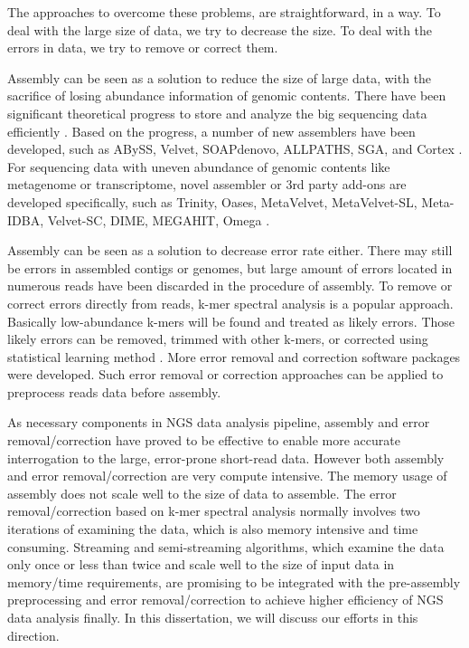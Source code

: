 The approaches to overcome these problems, are straightforward, in a way. To deal
with the large size of data, we try to decrease the size. To deal with the 
errors in data, we try to remove or correct them. 

Assembly can be seen as a solution to reduce the size of large data, with the 
sacrifice of losing abundance information of genomic contents. There have
been significant theoretical progress to store and analyze the big sequencing data
efficiently
\cite{pubmed22068540,pubmed20529929}. Based on the progress, a number of new 
assemblers have been developed,
such as ABySS, Velvet, SOAPdenovo, ALLPATHS, SGA, and Cortex
\cite{pubmed19251739,pubmed18349386,pubmed20511140,pubmed21187386,
pubmed22156294,Iqbal2012}. For sequencing data with uneven abundance of genomic contents
like metagenome or transcriptome, novel assembler or 3rd party add-ons are developed
specifically, such as Trinity, Oases, MetaVelvet, MetaVelvet-SL, Meta-IDBA, Velvet-SC, DIME, MEGAHIT, Omega
\cite{pubmed21572440,pubmed22368243,Namiki2012,Afiahayati2015, pubmed21685107,pubmed21926975,Guo2015,Li2015,Haider2014}.

Assembly can be seen as a solution to decrease error rate either. There may still
be errors in assembled contigs or genomes, but large amount of errors located in 
numerous reads have been discarded in the procedure of assembly. 
To remove or correct errors directly from reads, k-mer spectral analysis is 
a popular approach\cite{Pevzner2001}. Basically low-abundance k-mers will be found and treated as 
likely errors. Those likely errors can be removed, trimmed with other k-mers, 
or corrected using statistical learning method \cite{Kelley2010}. More error
removal and correction software packages were developed\cite{Medvedev2011,pubmed15059830,Kelley2010}.
Such error removal or correction approaches can be applied to preprocess
reads data before assembly.

As necessary components in NGS data analysis pipeline, assembly and error removal/correction
have proved to be effective to enable more accurate interrogation to the large,
error-prone short-read data. However both assembly and error removal/correction are
very compute intensive. The memory usage of assembly does not scale well to the size
of data to assemble. The error removal/correction based on k-mer spectral analysis
normally involves two iterations of examining the data, which is also memory intensive
and time consuming. Streaming and semi-streaming algorithms, which examine the data 
only once or less than twice and scale well to the size of input data in memory/time 
requirements, are promising to be integrated with the pre-assembly preprocessing
and error removal/correction to achieve higher efficiency of NGS data analysis finally.
In this dissertation, we will discuss our efforts in this direction.




